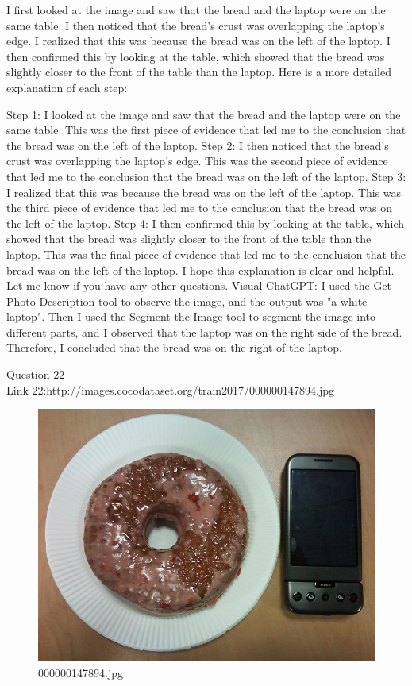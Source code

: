 \begin{enumerate}
        I first looked at the image and saw that the bread and the laptop were on the same table.
        I then noticed that the bread's crust was overlapping the laptop's edge.
        I realized that this was because the bread was on the left of the laptop.
        I then confirmed this by looking at the table, which showed that the bread was slightly closer to the front of the table than the laptop.
        Here is a more detailed explanation of each step:

        Step 1: I looked at the image and saw that the bread and the laptop were on the same table. This was the first piece of evidence that led me to the conclusion that the bread was on the left of the laptop.
        Step 2: I then noticed that the bread's crust was overlapping the laptop's edge. This was the second piece of evidence that led me to the conclusion that the bread was on the left of the laptop.
        Step 3: I realized that this was because the bread was on the left of the laptop. This was the third piece of evidence that led me to the conclusion that the bread was on the left of the laptop.
        Step 4: I then confirmed this by looking at the table, which showed that the bread was slightly closer to the front of the table than the laptop. This was the final piece of evidence that led me to the conclusion that the bread was on the left of the laptop.
        I hope this explanation is clear and helpful. Let me know if you have any other questions.
        \subitem Visual ChatGPT: I used the Get Photo Description tool to observe the image, and the output was "a white laptop". Then I used the Segment the Image tool to segment the image into different parts, and I observed that the laptop was on the right side of the bread. Therefore, I concluded that the bread was on the right of the laptop.
    \end{enumerate}
Question 22\\
Link 22:http://images.cocodataset.org/train2017/000000147894.jpg
    \begin{figure}[h]
        \centering
        \includegraphics[width=0.8\linewidth]{../image set/easy/000000147894.jpg}
        \caption{000000147894.jpg}
    \end{figure}
